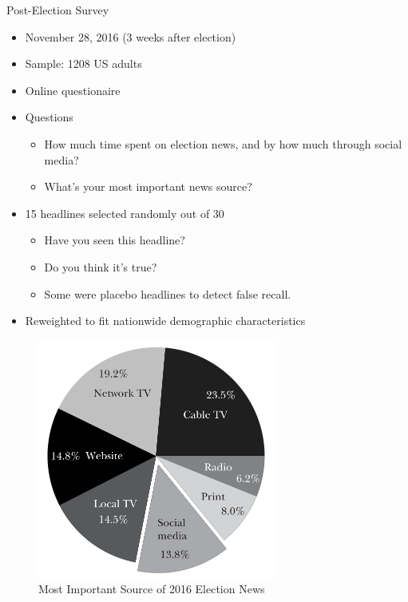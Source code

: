 \documentclass[
  10pt,
  ignorenonframetext,
  aspectratio=43,
]{beamer}
\providecommand{\tightlist}{%
  \setlength{\itemsep}{0pt}\setlength{\parskip}{0pt}}
\begin{document}
\begin{frame}{Post-Election Survey}
\protect\hypertarget{post-election-survey}{}
\begin{itemize}
\tightlist
\item
  November 28, 2016 (3 weeks after election)
\item
  Sample: 1208 US adults
\item
  Online questionaire
\item
  Questions

  \begin{itemize}
  \tightlist
  \item
    How much time spent on election news, and by how much through social
    media?
  \item
    What's your most important news source?
  \end{itemize}
\item
  15 headlines selected randomly out of 30

  \begin{itemize}
  \tightlist
  \item
    Have you seen this headline?
  \item
    Do you think it's true?
  \item
    Some were placebo headlines to detect false recall.
  \end{itemize}
\item
  Reweighted to fit nationwide demographic characteristics
\end{itemize}
\end{frame}

\begin{frame}
\begin{figure}
\centering
\includegraphics[width=0.7\textwidth,height=\textheight]{20220315-allcott-gentzkow-2016-election-fake-news.assets/image-20220314204054746.png}
\caption{Most Important Source of 2016 Election News}
\end{figure}
\end{frame}
\end{document}
